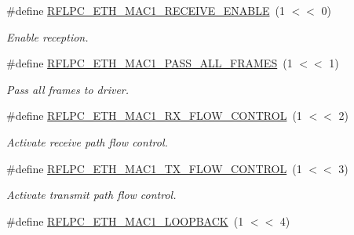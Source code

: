 \begin{DoxyCompactItemize}
\item 
\hypertarget{group__eth_gad2805dffcc41321bc82ae2e11be45a36}{\#define \hyperlink{group__eth_gad2805dffcc41321bc82ae2e11be45a36}{R\-F\-L\-P\-C\-\_\-\-E\-T\-H\-\_\-\-M\-A\-C1\-\_\-\-R\-E\-C\-E\-I\-V\-E\-\_\-\-E\-N\-A\-B\-L\-E}~(1 $<$$<$ 0)}\label{group__eth_gad2805dffcc41321bc82ae2e11be45a36}

\begin{DoxyCompactList}\small\item\em Enable reception. \end{DoxyCompactList}\item 
\hypertarget{group__eth_ga9abdb375a32fd4bf6180efafbfb84a40}{\#define \hyperlink{group__eth_ga9abdb375a32fd4bf6180efafbfb84a40}{R\-F\-L\-P\-C\-\_\-\-E\-T\-H\-\_\-\-M\-A\-C1\-\_\-\-P\-A\-S\-S\-\_\-\-A\-L\-L\-\_\-\-F\-R\-A\-M\-E\-S}~(1 $<$$<$ 1)}\label{group__eth_ga9abdb375a32fd4bf6180efafbfb84a40}

\begin{DoxyCompactList}\small\item\em Pass all frames to driver. \end{DoxyCompactList}\item 
\hypertarget{group__eth_ga64151ed3da6ba4769f0b804bc1e5bfdd}{\#define \hyperlink{group__eth_ga64151ed3da6ba4769f0b804bc1e5bfdd}{R\-F\-L\-P\-C\-\_\-\-E\-T\-H\-\_\-\-M\-A\-C1\-\_\-\-R\-X\-\_\-\-F\-L\-O\-W\-\_\-\-C\-O\-N\-T\-R\-O\-L}~(1 $<$$<$ 2)}\label{group__eth_ga64151ed3da6ba4769f0b804bc1e5bfdd}

\begin{DoxyCompactList}\small\item\em Activate receive path flow control. \end{DoxyCompactList}\item 
\hypertarget{group__eth_ga0edb0e465dcdec19f7d87d1eb51c57a7}{\#define \hyperlink{group__eth_ga0edb0e465dcdec19f7d87d1eb51c57a7}{R\-F\-L\-P\-C\-\_\-\-E\-T\-H\-\_\-\-M\-A\-C1\-\_\-\-T\-X\-\_\-\-F\-L\-O\-W\-\_\-\-C\-O\-N\-T\-R\-O\-L}~(1 $<$$<$ 3)}\label{group__eth_ga0edb0e465dcdec19f7d87d1eb51c57a7}

\begin{DoxyCompactList}\small\item\em Activate transmit path flow control. \end{DoxyCompactList}\item 
\hypertarget{group__eth_gaa9b678e19c9b7c24cecef8f4fd537353}{\#define \hyperlink{group__eth_gaa9b678e19c9b7c24cecef8f4fd537353}{R\-F\-L\-P\-C\-\_\-\-E\-T\-H\-\_\-\-M\-A\-C1\-\_\-\-L\-O\-O\-P\-B\-A\-C\-K}~(1 $<$$<$ 4)}\label{group__eth_gaa9b678e19c9b7c24cecef8f4fd537353}


\end{DoxyCompactItemize}
